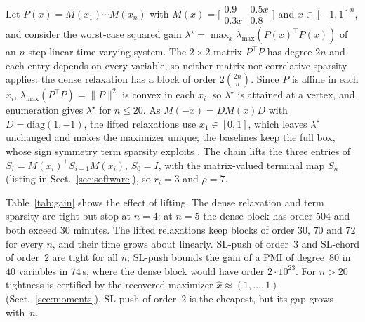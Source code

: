 \documentclass[smallextended]{svjour3}
\newcommand{\lmax}{\lambda_{\max}}
\begin{document}
Let $P(x)=M(x_1)\cdots M(x_n)$ with $M(x)=\bigl[\begin{smallmatrix}0.9&0.5x\\
0.3x&0.8\end{smallmatrix}\bigr]$ and $x\in[-1,1]^n$, and consider the
worst-case squared gain $\lambda^\star=\max_x\lmax(P(x)^\top P(x))$ of an
$n$-step linear time-varying system. The $2\times2$ matrix $P^\top P$ has
degree $2n$ and each entry depends on every variable, so neither matrix nor
correlative sparsity applies: the dense relaxation has a block of order
$2\binom{2n}{n}$. Since $P$ is affine in each $x_i$,
$\lmax(P^\top P)=\|P\|^2$ is convex in each $x_i$, so $\lambda^\star$ is
attained at a vertex, and enumeration gives $\lambda^\star$ for $n\le 20$.
As $M(-x)=DM(x)D$ with $D=\mathrm{diag}(1,-1)$, the lifted relaxations use
$x_1\in[0,1]$, which leaves $\lambda^\star$ unchanged and makes the maximizer
unique; the baselines keep the full box, whose sign symmetry term sparsity
exploits \cite{MillerWangGuo2026}. The chain lifts the three entries of
$S_i=M(x_i)^\top S_{i-1}M(x_i)$, $S_0=I$, with the matrix-valued terminal map
$S_n$ (listing in Sect.~\ref{sec:software}), so $r_i=3$ and $\rho=7$.

\begin{table}[t]
\caption{Worst-case gain (Sect.~\ref{sec:gain}): $\lambda^\star$ by vertex
enumeration ($^\dagger$: for $n>20$, the value at the recovered maximizer
rounded to the nearest vertex), largest PSD block, total time in seconds and
relative gap $(\text{bound}-\lambda^\star)/\lambda^\star$. The dense block
$2\binom{2n}{n}$ is listed also where the relaxation was not attempted.
Dense and TS bounds are tight whenever solved. $^*$: Clarabel reported
reduced accuracy.}
\label{tab:gain}
\centering\footnotesize\setlength{\tabcolsep}{1.6pt}

\end{table}

Table~\ref{tab:gain} shows the effect of lifting. The dense relaxation and
term sparsity are tight but stop at $n=4$: at $n=5$ the dense block has
order $504$ and both exceed 30 minutes. The lifted relaxations keep blocks
of order $30$, $70$ and $72$ for every $n$, and their time grows about
linearly. SL-push of order~$3$ and SL-chord of order~$2$ are tight for all
$n$; SL-push bounds the gain of a PMI of degree~$80$ in $40$ variables in
74\,s, where the dense block would have order $2\cdot10^{23}$. For $n>20$
tightness is certified by the recovered maximizer $\hat x\approx(1,\dots,1)$
(Sect.~\ref{sec:moments}). SL-push of order~$2$ is the cheapest, but its gap
grows with~$n$.
\end{document}
